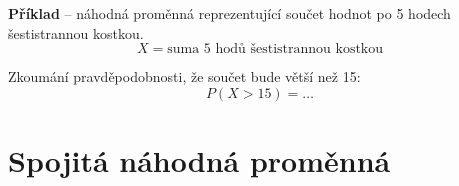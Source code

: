 \begin{compactitem}
    \item \textbf{Příklad} -- náhodná proměnná reprezentující součet hodnot po 5 hodech šestistrannou kostkou.
    $$ X = \text{suma 5 hodů šestistrannou kostkou} $$ \begin{compactitem}
        \item Zkoumání pravděpodobnosti, že součet bude větší než 15:
            $$ P(X > 15) = \ldots$$
    \end{compactitem}

\end{compactitem}


\section{Spojitá náhodná proměnná}

